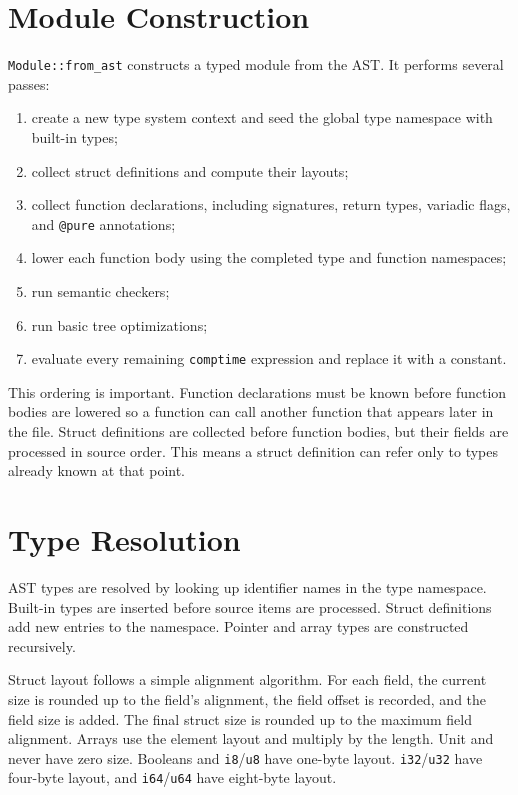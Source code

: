 \section{Module Construction}

\texttt{Module::from\_ast} constructs a typed module from the AST. It performs
several passes:

\begin{enumerate}
  \item create a new type system context and seed the global type namespace with
        built-in types;
  \item collect struct definitions and compute their layouts;
  \item collect function declarations, including signatures, return types,
        variadic flags, and \texttt{@pure} annotations;
  \item lower each function body using the completed type and function
        namespaces;
  \item run semantic checkers;
  \item run basic tree optimizations;
  \item evaluate every remaining \texttt{comptime} expression and replace it
        with a constant.
\end{enumerate}

This ordering is important. Function declarations must be known before function
bodies are lowered so a function can call another function that appears later in
the file. Struct definitions are collected before function bodies, but their
fields are processed in source order. This means a struct definition can refer
only to types already known at that point.

\section{Type Resolution}

AST types are resolved by looking up identifier names in the type namespace.
Built-in types are inserted before source items are processed. Struct
definitions add new entries to the namespace. Pointer and array types are
constructed recursively.

Struct layout follows a simple alignment algorithm. For each field, the current
size is rounded up to the field's alignment, the field offset is recorded, and
the field size is added. The final struct size is rounded up to the maximum
field alignment. Arrays use the element layout and multiply by the length. Unit
and never have zero size. Booleans and \texttt{i8}/\texttt{u8} have one-byte
layout. \texttt{i32}/\texttt{u32} have four-byte layout, and
\texttt{i64}/\texttt{u64} have eight-byte layout.

